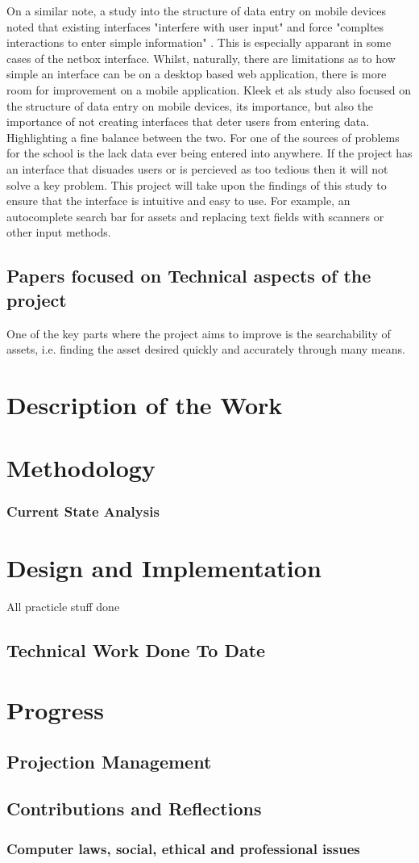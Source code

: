 \documentclass [12pt,letterpaper]{article}
\begin{document}
On a similar note, a study into the structure of data entry on mobile devices noted that existing interfaces "interfere with user input" and force "compltes interactions to enter simple information" \cite{van2007gui}. This is especially apparant in some cases of the netbox interface. Whilst, naturally, there are limitations as to how simple an interface can be on a desktop based web application, there is more room for improvement on a mobile application. Kleek et als study also focused on the structure of data entry on mobile devices, its importance, but also the importance of not creating interfaces that deter users from entering data. Highlighting a fine balance between the two. For one of the sources of problems for the school is the lack data ever being entered into anywhere. If the project has an interface that disuades users or is percieved as too tedious then it will not solve a key problem. This project will take upon the findings of this study to ensure that the interface is intuitive and easy to use. For example, an autocomplete search bar for assets and replacing text fields with scanners or other input methods. 

\subsection{Papers focused on Technical aspects of the project}
\label{sec:technical}
One of the key parts where the project aims to improve is the searchability of assets, i.e. finding the asset desired quickly and accurately through many means.  

\section{Description of the Work}
\label{sec:work}

\section{Methodology}
\subsubsection{Current State Analysis}
\label{sec:current_state_analysis}
\section{Design and Implementation}
\label{sec:design}
All practicle stuff done
\subsection{Technical Work Done To Date}

\section{Progress}
\subsection{Projection Management}
\subsection{Contributions and Reflections}
\subsubsection{Computer laws, social, ethical and professional issues}
\pagebreak

 
\end{document}
